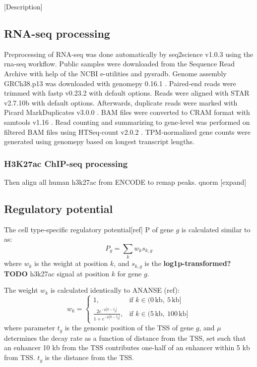 [Description]

\subsection{RNA-seq processing}

Preprocessing of RNA-seq was done automatically by seq2science v1.0.3 \cite{seq2science} using the rna-seq workflow. Public samples were downloaded from the Sequence Read Archive \cite{Leinonen2010} with help of the NCBI e-utilities and pysradb\cite{Choudhary2019}. Genome assembly GRCh38.p13 was downloaded with genomepy 0.16.1 \cite{Frlich2023}. Paired-end reads were trimmed with fastp v0.23.2 \cite{Chen2018} with default options. Reads were aligned with STAR v2.7.10b \cite{Dobin2012} with default options. Afterwards, duplicate reads were marked with Picard MarkDuplicates v3.0.0 \cite{picard}. BAM files were converted to CRAM format with samtools v1.16 \cite{Danecek2021}. Read counting and summarizing to gene-level was performed on filtered BAM files using HTSeq-count v2.0.2 \cite{Anders2014}. TPM-normalized gene counts were generated using genomepy based on longest transcript lengths.

\subsubsection{H3K27ac ChIP-seq processing}

Then align all human h3k27ac from ENCODE to remap peaks. qnorm \cite{qnorm}
[expand]

\subsection{Regulatory potential}

The cell type-specific regulatory potential[ref] P of gene $g$ is calculated similar to as:
        \begin{equation*}
            P_g = \sum_k w_{k}s_{k,g}
        \end{equation*}
        where $w_k$ is the weight at position $k$, and $s_{k,g}$ is the \textbf{log1p-transformed? TODO} h3k27ac signal at position $k$ for gene $g$.
        
The weight $w_k$ is calculated identically to ANANSE (ref):
        \begin{equation*}
            w_k = \begin{cases}
                1, & \text{if } k \in (0\,\text{kb},\ 5\,\text{kb}] \\
                \frac{2e^{-\mu|k-t_g|}}{1+e^{-\mu|k-t_g|}}, & \text{if } k \in (5\,\text{kb},\ 100\,\text{kb}]
            \end{cases}
        \end{equation*}
        where parameter $t_g$ is the genomic position of the TSS of gene $g$, and $\mu$ determines the decay rate as a function of distance from the TSS, set such that an enhancer 10 kb from the TSS contributes one-half of an enhancer within 5 kb from TSS. $t_g$ is the distance from the TSS.


